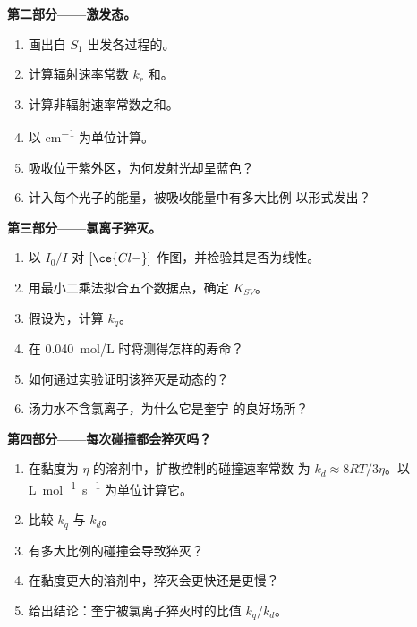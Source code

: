 \begin{problem}
\medskip\noindent\textbf{第二部分——激发态。}
\begin{enumerate}[resume]
  \item 画出自 $S_1$ 出发各过程的。
  \item 计算辐射速率常数 $k_r$ 和。
  \item 计算非辐射速率常数之和。
  \item 以 \unit{cm^{-1}} 为单位计算。
  \item 吸收位于紫外区，为何发射光却呈蓝色？
  \item 计入每个光子的能量，被吸收能量中有多大比例
        以形式发出？
\end{enumerate}

\medskip\noindent\textbf{第三部分——氯离子猝灭。}
\begin{enumerate}[resume]
  \item 以 $I_0/I$ 对 $[\ce{Cl-}]$ 作图，并检验其是否为线性。
  \item 用最小二乘法拟合五个数据点，确定 $K_{SV}$。
  \item 假设为，计算 $k_q$。
  \item 在 \qty{0.040}{mol/L} 时将测得怎样的寿命？
  \item 如何通过实验证明该猝灭是动态的？
  \item 汤力水不含氯离子，为什么它是奎宁
        的良好场所？
\end{enumerate}

\medskip\noindent\textbf{第四部分——每次碰撞都会猝灭吗？}
\begin{enumerate}[resume]
  \item 在黏度为 $\eta$ 的溶剂中，扩散控制的碰撞速率常数
        为 $k_d \approx 8RT/3\eta$。以 \unit{L.mol^{-1}.s^{-1}} 为单位计算它。
  \item 比较 $k_q$ 与 $k_d$。
  \item 有多大比例的碰撞会导致猝灭？
  \item 在黏度更大的溶剂中，猝灭会更快还是更慢？
  \item 给出结论：奎宁被氯离子猝灭时的比值
        $k_q/k_d$。
\end{enumerate}
\end{problem}
